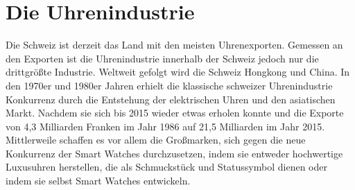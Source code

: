 \clearpage
\chapter{Die Uhrenindustrie}
Die Schweiz ist derzeit das Land mit den meisten Uhrenexporten. Gemessen an den Exporten ist die Uhrenindustrie innerhalb der Schweiz jedoch nur die drittgrößte Industrie. Weltweit gefolgt wird die Schweiz Hongkong und China. 
In den 1970er und 1980er Jahren erhielt die klassische schweizer Uhrenindustrie Konkurrenz durch die Entstehung der elektrischen Uhren und den asiatischen Markt. Nachdem sie sich bis 2015 wieder etwas erholen konnte und die Exporte von 4,3 Milliarden Franken im Jahr 1986 auf 21,5 Milliarden im Jahr 2015. 
Mittlerweile schaffen es vor allem die Großmarken, sich gegen die neue Konkurrenz der Smart Watches durchzusetzen, indem sie entweder hochwertige Luxusuhren herstellen, die als Schmuckstück und Statussymbol dienen oder indem sie selbst Smart Watches entwickeln.
